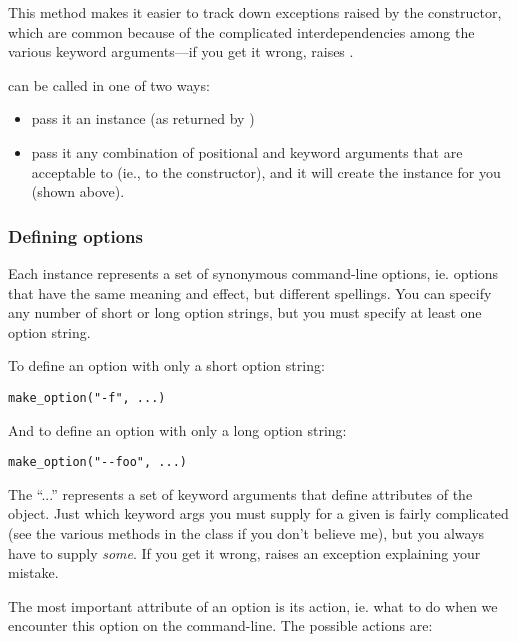This method makes it easier to track down exceptions raised by the
 constructor, which are common because of the complicated
interdependencies among the various keyword arguments---if you get it
wrong,  raises .

 can be called in one of two ways:

\begin{itemize}
\item pass it an  instance  (as returned by )
\item pass it any combination of positional and keyword arguments that
are acceptable to  (ie., to the 
constructor), and it will create the  instance for you
(shown above).
\end{itemize}

\subsubsection{Defining options\label{optparse-defining-options}}

Each  instance represents a set of synonymous
command-line options, ie. options that have the same meaning and
effect, but different spellings.  You can specify any number of short
or long option strings, but you must specify at least one option
string.

To define an option with only a short option string:

\begin{verbatim}
make_option("-f", ...)
\end{verbatim}

And to define an option with only a long option string:

\begin{verbatim}
make_option("--foo", ...)
\end{verbatim}

The ``...'' represents a set of keyword arguments that define
attributes of the  object.  Just which keyword args you
must supply for a given  is fairly complicated (see the
various  methods in the  class if you
don't believe me), but you always have to supply \emph{some}.  If you
get it wrong,  raises an 
exception explaining your mistake.

The most important attribute of an option is its action, ie. what to do
when we encounter this option on the command-line.  The possible actions
are:

